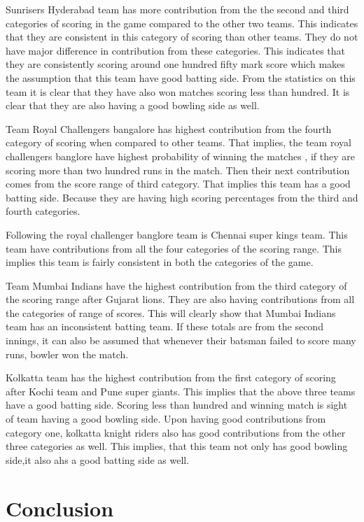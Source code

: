 \documentclass[sigconf]{acmart}
\begin{document}
Sunrisers Hyderabad team has more contribution from the the second and third categories of scoring in the game compared to the other two teams. This indicates that they are consistent in this category of scoring than other teams. They do not have major difference in contribution from these categories. This indicates that they are consistently scoring around one hundred fifty mark score which makes the assumption that this team have good batting side. From the statistics on this team it is clear that they have also won matches scoring less than hundred. It is clear that they are also having a good bowling side as well. 

Team Royal Challengers bangalore has highest contribution from the fourth category of scoring when compared to other teams. That implies, the team royal challengers banglore have highest probability of winning the matches , if they are scoring more than two hundred runs in the match. Then their next contribution comes from the score range of third category. That implies this team has a good batting side. Because they are having high scoring percentages from the third and fourth categories. 

Following the royal challenger banglore team is Chennai super kings team. This team have contributions from all the four categories of the scoring range. This implies this team is fairly consistent in both the categories of the game. 

Team Mumbai Indians have the highest contribution from the third category of the scoring range after Gujarat lions. They are also having contributions from all the categories of range of scores. This will clearly show that Mumbai Indians team has an inconsistent batting team. If these totals are from the second innings, it can also be assumed that whenever their batsman failed to score many runs, bowler won the match. 

Kolkatta team has the highest contribution from the first category of scoring after Kochi team and Pune super giants. This implies that the above three teams have a good batting side. Scoring less than hundred and winning match is sight of team having a good bowling side. Upon having good contributions from category one, kolkatta knight riders also has good contributions from the other three categories as well. This implies, that this team not only has good bowling side,it also ahs a good batting side as well.
 
 
\section{Conclusion}
\end{document}
